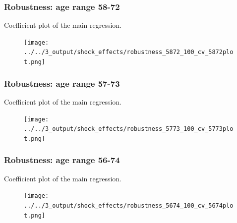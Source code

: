 \documentclass[10pt,compress,xcolor=dvipsnames]{beamer}    %
\newcounter{ex}
\newcommand{\1}[1]{\mathrm{1\hspace*{-2.5pt}l}[#1]}	%
\begin{document}
\begin{frame}
\frametitle{Robustness: age range 58-72}
Coefficient plot of the main regression.
\begin{figure}[hbtp]
\centering
\texttt{[image: ../../3\_output/shock\_effects/robustness\_5872\_100\_cv\_5872plot.png]}
\label{fig:coeffplot58-72}
\end{figure}
\hyperlink{frame:robustness}{}
\end{frame}

\begin{frame}
\frametitle{Robustness: age range 57-73}
Coefficient plot of the main regression.
\begin{figure}[hbtp]
\centering
\texttt{[image: ../../3\_output/shock\_effects/robustness\_5773\_100\_cv\_5773plot.png]}
\label{fig:coeffplot57-73}
\end{figure}
\hyperlink{frame:robustness}{}
\end{frame}

\begin{frame}
\frametitle{Robustness: age range 56-74}
Coefficient plot of the main regression.
\begin{figure}[hbtp]
\centering
\texttt{[image: ../../3\_output/shock\_effects/robustness\_5674\_100\_cv\_5674plot.png]}
\label{fig:coeffplot56-74}
\end{figure}
\hyperlink{frame:robustness}{}
\end{frame}
\end{document}
